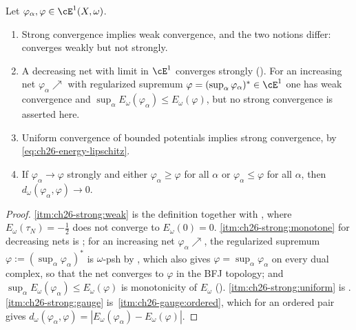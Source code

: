 \begin{proposition}
\label{prop:ch26-strong-basic}
Let $\varphi_\alpha,\varphi\in\cE^1(X,\omega)$.
\begin{enumerate}
\item\label{itm:ch26-strong:weak}
 Strong convergence implies weak convergence, and the two notions differ:
  converges weakly but not strongly.
\item\label{itm:ch26-strong:monotone}
 A decreasing net with limit in $\cE^1$ converges strongly
 ().  For an increasing net
 $\varphi_\alpha\nearrow$ with regularized supremum
 $\varphi=(\sup_\alpha\varphi_\alpha)^*\in\cE^1$ one has weak convergence
 and $\sup_\alpha E_\omega(\varphi_\alpha)\leq E_\omega(\varphi)$, but no
 strong convergence is asserted here.
\item\label{itm:ch26-strong:uniform}
 Uniform convergence of bounded potentials implies strong convergence, by
 \eqref{eq:ch26-energy-lipschitz}.
\item\label{itm:ch26-strong:gauge}
 If $\varphi_\alpha\to\varphi$ strongly and either
 $\varphi_\alpha\geq\varphi$ for all $\alpha$ or
 $\varphi_\alpha\leq\varphi$ for all $\alpha$, then
 $d_\omega(\varphi_\alpha,\varphi)\to0$.
\end{enumerate}
\end{proposition}

\begin{proof}
\cref{itm:ch26-strong:weak} is the definition together with
, where $E_\omega(\tau_N)=-\tfrac12$ does not
converge to $E_\omega(0)=0$.  \cref{itm:ch26-strong:monotone} for decreasing
nets is ; for an increasing net
$\varphi_\alpha\nearrow$, the regularized supremum
$\varphi:=(\sup_\alpha\varphi_\alpha)^*$ is $\omega$-psh by
, which also gives
$\varphi=\sup_\alpha\varphi_\alpha$ on every dual complex, so that the net
converges to $\varphi$ in the BFJ topology; and
$\sup_\alpha E_\omega(\varphi_\alpha)\leq E_\omega(\varphi)$ is
monotonicity of $E_\omega$ ().
\cref{itm:ch26-strong:uniform} is .
\cref{itm:ch26-strong:gauge} is
\,\cref{itm:ch26-gauge:ordered}, which for an
ordered pair gives $d_\omega(\varphi_\alpha,\varphi)
=|E_\omega(\varphi_\alpha)-E_\omega(\varphi)|$.
\end{proof}

